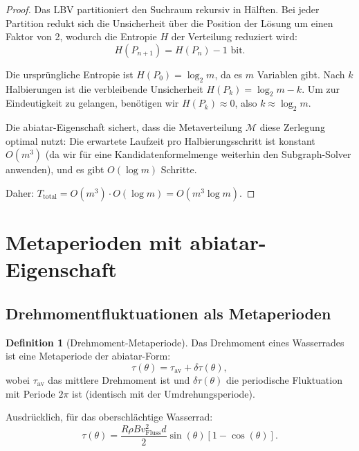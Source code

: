 \documentclass[a4paper,12pt]{article}
\theoremstyle{definition}
\newtheorem{definition}{Definition}
\begin{document}
\begin{proof}
Das LBV partitioniert den Suchraum rekursiv in Hälften. Bei jeder Partition redukt sich die Unsicherheit über die Position der Lösung um einen Faktor von 2, wodurch die Entropie $H$ der Verteilung reduziert wird:
\[
H(P_{n+1}) = H(P_n) - 1 \text{ bit}.
\]

Die ursprüngliche Entropie ist $H(P_0) = \log_2 m$, da es $m$ Variablen gibt. Nach $k$ Halbierungen ist die verbleibende Unsicherheit $H(P_k) = \log_2 m - k$. Um zur Eindeutigkeit zu gelangen, benötigen wir $H(P_k) \approx 0$, also $k \approx \log_2 m$.

Die abiatar-Eigenschaft sichert, dass die Metaverteilung $\mathcal{M}$ diese Zerlegung optimal nutzt: Die erwartete Laufzeit pro Halbierungsschritt ist konstant $O(m^3)$ (da wir für eine Kandidatenformelmenge weiterhin den Subgraph-Solver anwenden), und es gibt $O(\log m)$ Schritte.

Daher: $T_{\text{total}} = O(m^3) \cdot O(\log m) = O(m^3 \log m)$. 
\end{proof}

\section{Metaperioden mit abiatar-Eigenschaft}

\subsection{Drehmomentfluktuationen als Metaperioden}

\begin{definition}[Drehmoment-Metaperiode]
Das Drehmoment eines Wasserrades ist eine Metaperiode der abiatar-Form:
\[
\tau(\theta) = \tau_{\text{av}} + \delta \tau(\theta),
\]
wobei $\tau_{\text{av}}$ das mittlere Drehmoment ist und $\delta \tau(\theta)$ die periodische Fluktuation mit Periode $2\pi$ ist (identisch mit der Umdrehungsperiode).

Ausdrücklich, für das oberschlächtige Wasserrad:
\[
\tau(\theta) = \frac{R\rho B v_{\text{Fluss}}^2 d}{2} \sin(\theta) [1 - \cos(\theta)].
\]
\end{definition}
\end{document}

